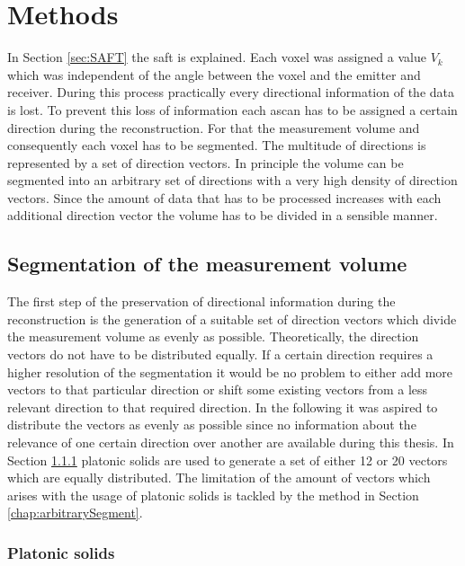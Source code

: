 \chapter{Methods}
\label{chap:methods}

In Section \ref{sec:SAFT} the \ac{saft} is explained. Each voxel was assigned a value $V_k$ which was independent of the angle between the voxel and the emitter and receiver. During this process practically every directional information of the data is lost. 
To prevent this loss of information each \ac{ascan} has to be assigned a certain direction during the reconstruction.
For that the measurement volume and consequently each voxel has to be segmented. The multitude of directions is represented by a set of direction vectors. In principle the volume can be segmented into an arbitrary set of directions with a very high density of direction vectors. Since the amount of data that has to be processed increases with each additional direction vector the volume has to be divided in a sensible manner.


\section{Segmentation of the measurement volume}
\label{chap:segmentation}


The first step of the preservation of directional information during the reconstruction is the generation of a suitable set of direction vectors which divide the measurement volume as evenly as possible. Theoretically, the direction vectors do not have to be distributed equally. If a certain direction requires a higher resolution of the segmentation it would be no problem to either add more vectors to that particular direction or shift some existing vectors from a less relevant direction to that required direction. In the following it was aspired to distribute the vectors as evenly as possible since no information about the relevance of one certain direction over another are available during this thesis.
In Section \ref{chap:platonicsolids} platonic solids are used to generate a set of either 12 or 20 vectors which are equally distributed. The limitation of the amount of vectors which arises with the usage of platonic solids is tackled by the method in Section \ref{chap:arbitrarySegment}.



\subsection{Platonic solids}
\label{chap:platonicsolids}

